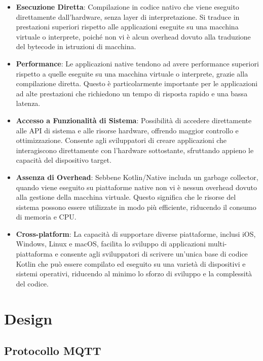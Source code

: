\documentclass[12pt,a4paper,openright,twoside]{book}
\begin{document}
\begin{itemize}
\item \textbf{Esecuzione Diretta}: Compilazione in codice nativo che viene eseguito direttamente dall'hardware, senza layer di interpretazione. 
Si traduce in prestazioni superiori rispetto alle applicazioni eseguite su una macchina virtuale o interprete, poiché non vi è alcun overhead dovuto alla traduzione 
del bytecode in istruzioni di macchina.
\item \textbf{Performance}: Le applicazioni native tendono ad avere performance superiori rispetto a quelle eseguite su una macchina virtuale o interprete, 
grazie alla compilazione diretta. Questo è particolarmente importante per le applicazioni ad alte prestazioni che richiedono un tempo di risposta rapido e una bassa latenza.
\item \textbf{Accesso a Funzionalità di Sistema}: Possibilità di accedere direttamente alle API di sistema e alle risorse hardware, offrendo maggior controllo e ottimizzazione. 
Consente agli sviluppatori di creare applicazioni che interagiscono direttamente con l'hardware sottostante, sfruttando appieno le capacità del dispositivo target.
\item \textbf{Assenza di Overhead}: Sebbene Kotlin/Native includa un garbage collector, quando viene eseguito su piattaforme native non vi è nessun overhead dovuto alla 
gestione della macchina virtuale. Questo significa che le risorse del sistema possono essere utilizzate in modo più efficiente, riducendo il consumo di memoria e CPU.
\item \textbf{Cross-platform}: La capacità di supportare diverse piattaforme, inclusi iOS, Windows, Linux e macOS, facilita lo sviluppo di applicazioni multi-piattaforma e 
consente agli sviluppatori di scrivere un'unica base di codice Kotlin che può essere compilato ed eseguito su una varietà di dispositivi e sistemi operativi, 
riducendo al minimo lo sforzo di sviluppo e la complessità del codice.
\end{itemize}

\chapter{Design}\label{chap:Design}

\section{Protocollo MQTT}
\end{document}

